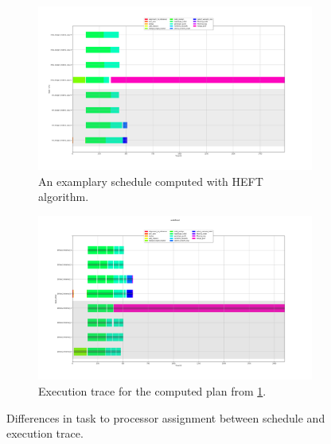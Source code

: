 \begin{figure}[H]
\begin{subfigure}{1\textwidth}
\centering
\includegraphics[width=1\linewidth]{figures/5-2-soykb_heft.png}
\caption[ScheduleOnly]{An examplary schedule computed with HEFT algorithm.} 
\label{fig:solution:sched:plan}
\end{subfigure}
\begin{subfigure}{1\textwidth}
\centering
\includegraphics[width=1\linewidth]{figures/4-1-NoAgglo-HEFT.png}
\caption[ScheuleHEFT]{Execution trace for the computed plan from \cref{fig:solution:sched:plan}.}
\label{fig:solution:sched:heft}
\end{subfigure}
\centering

\caption[Differences between computed schedule and execution trace]{Differences in task to processor assignment between schedule and execution trace.}


\label{fig:solution:sched:plan-vs-trace}
\end{figure}
